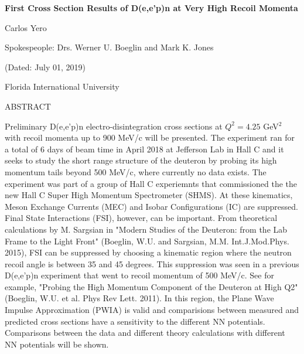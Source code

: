 \documentclass[a4paper]{article}
\begin{document}

\Large
 \begin{center}
\textbf{First Cross Section Results of D(e,e'p)n at Very High Recoil Momenta\\} 

\hspace{10pt}

\large
Carlos Yero \\

\hspace{10pt}

\small
Spokespeople: Drs. Werner U. Boeglin and Mark K. Jones

\hspace{10pt}

\small
(Dated: July 01, 2019) \\

\hspace{10pt}

\small  
Florida International University\\

\end{center}

\hspace{10pt}

\large
\begin{center}
ABSTRACT
\end{center}
\normalsize

\noindent Preliminary D(e,e'p)n electro-disintegration cross sections at $Q^{2} = 4.25$ GeV$^{2}$ with recoil momenta up to 900 MeV/c will be
presented. The experiment ran for a total of 6 days of beam time in April 2018 at Jefferson Lab in Hall C
and it seeks to study the short range structure of the deuteron by probing its high momentum tails
beyond 500 MeV/c, where currently no data exists. The experiment was part of a group of Hall C experiemnts that commissioned the
the new Hall C Super High Momentum Spectrometer (SHMS). At these kinematics, Meson Exchange Currents (MEC) and Isobar Configurations (IC)
are suppressed. Final State Interactions (FSI), however, can be important. From theoretical calculations by M. Sargsian in
"Modern Studies of the Deuteron: from the Lab Frame to the Light Front" (Boeglin, W.U. and Sargsian, M.M. Int.J.Mod.Phys. 2015),
FSI can be suppressed by choosing a kinematic region where the neutron recoil angle is between 35 and 45 degrees. This suppression
was seen in a previous D(e,e'p)n experiment that went to recoil momentum of 500 MeV/c. See for example, "Probing the High Momentum Component
of the Deuteron at High Q2" (Boeglin, W.U. et al. Phys Rev Lett. 2011). In this region, the Plane Wave Impulse Approximation (PWIA) is valid
and comparisions between measured and predicted cross sections have a sensitivity to the different NN potentials. Comparisons between the data
and different theory calculations with different NN potentials will be shown.
\end{document}
